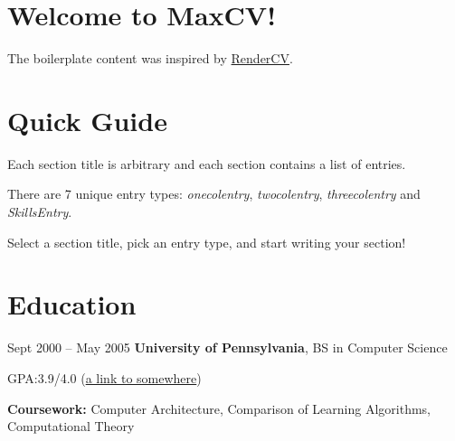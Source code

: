 \documentclass{maxcv}
\begin{document}
\CVHeader{}

\section{Welcome to MaxCV!}
\begin{onecolentry}
    The boilerplate content was inspired by \href{https://github.com/rendercv/}{RenderCV}.
\end{onecolentry}

\section{Quick Guide}

\begin{onecolentry}
    \begin{highlightsforbulletentries}
        \item Each section title is arbitrary and each section contains a list of entries.
        \item There are 7 unique entry types: \textit{onecolentry}, \textit{twocolentry}, \textit{threecolentry} and \textit{SkillsEntry}.
        \item Select a section title, pick an entry type, and start writing your section!
    \end{highlightsforbulletentries}
\end{onecolentry}


\section{Education}
\begin{twocolentry}{
        Sept 2000 – May 2005
    }
    \textbf{University of Pennsylvania}, BS in Computer Science\end{twocolentry}

\vspace{0.10 cm}
\begin{onecolentry}
    \begin{highlights}
        \item GPA:\@ 3.9/4.0 (\href{https://example.com}{a link to somewhere})
        \item \textbf{Coursework:} Computer Architecture, Comparison of Learning Algorithms, Computational Theory
    \end{highlights}
\end{onecolentry}
\end{document}
